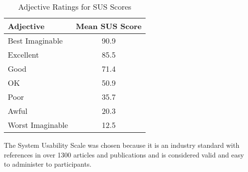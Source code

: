 \begin{table}[ht]
  \centering
  \begin{tabular}{lc}
    \toprule
    Adjective & Mean SUS Score\\
    \midrule
    Best Imaginable & 90.9\\
    Excellent & 85.5\\
    Good & 71.4\\
    OK & 50.9\\
    Poor & 35.7\\
    Awful & 20.3\\
    Worst Imaginable & 12.5\\
    \bottomrule
  \end{tabular}
  \caption{Adjective Ratings for SUS Scores}\label{fig:susadj}
\end{table}

The System Usability Scale was chosen because it is an industry standard with references in over 1300 articles and publications and is considered valid and easy to administer to participants. \citep{Gov}